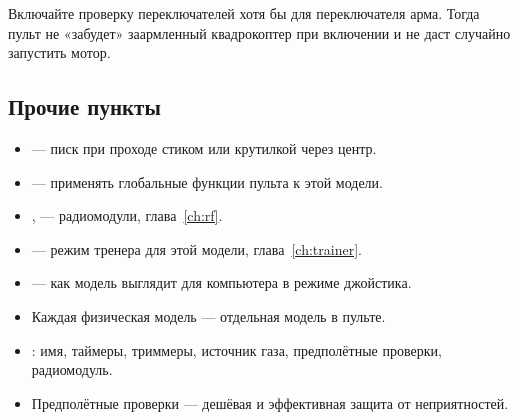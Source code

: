 \begin{tip}
Включайте проверку переключателей хотя бы для переключателя арма. Тогда пульт не
«забудет» заармленный квадрокоптер при включении и не даст случайно запустить мотор.
\end{tip}

\subsection{Прочие пункты}

\begin{itemize}
  \item {} --- писк при проходе стиком или крутилкой через центр.
  \item {} --- применять глобальные функции пульта к этой модели.
  \item {},  --- радиомодули, глава~\ref{ch:rf}.
  \item {} --- режим тренера для этой модели, глава~\ref{ch:trainer}.
  \item {} --- как модель выглядит для компьютера в режиме джойстика.
\end{itemize}

\begin{summary}
\begin{itemize}
  \item Каждая физическая модель --- отдельная модель в пульте.
  \item {}: имя, таймеры, триммеры, источник газа, предполётные проверки, радиомодуль.
  \item Предполётные проверки --- дешёвая и эффективная защита от неприятностей.
\end{itemize}
\end{summary}
